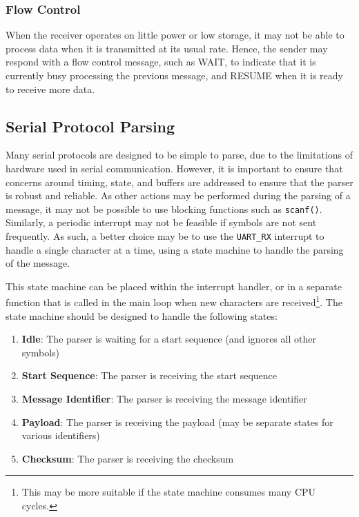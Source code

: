 \documentclass{article}
\begin{document}
\subsubsection{Flow Control}
When the receiver operates on little power or low storage, it may not
be able to process data when it is transmitted at its usual rate.
Hence, the sender may respond with a flow control message, such as
WAIT, to indicate that it is currently busy processing the previous
message, and RESUME when it is ready to receive more data.
\subsection{Serial Protocol Parsing}
Many serial protocols are designed to be simple to parse, due to the
limitations of hardware used in serial communication. However, it is
important to ensure that concerns around timing, state, and buffers are
addressed to ensure that the parser is robust and reliable. As other
actions may be performed during the parsing of a message, it may not be
possible to use blocking functions such as \texttt{scanf()}.
Similarly, a periodic interrupt may not be feasible if symbols are not
sent frequently. As such, a better choice may be to use the
\texttt{UART_RX} interrupt to handle a single character at a
time, using a state machine to handle the parsing of the message.

This state machine can be placed within the interrupt handler, or in a
separate function that is called in the main loop when new characters
are received\footnote{This may be more suitable if the state machine
consumes many CPU cycles.}. The state machine should be designed to
handle the following states:
\begin{enumerate}
    \item \textbf{Idle}: The parser is waiting for a start sequence (and ignores all other symbols)
    \item \textbf{Start Sequence}: The parser is receiving the start sequence
    \item \textbf{Message Identifier}: The parser is receiving the message identifier
    \item \textbf{Payload}: The parser is receiving the payload (may be separate states for various identifiers)
    \item \textbf{Checksum}: The parser is receiving the checksum
\end{enumerate}
\end{document}
